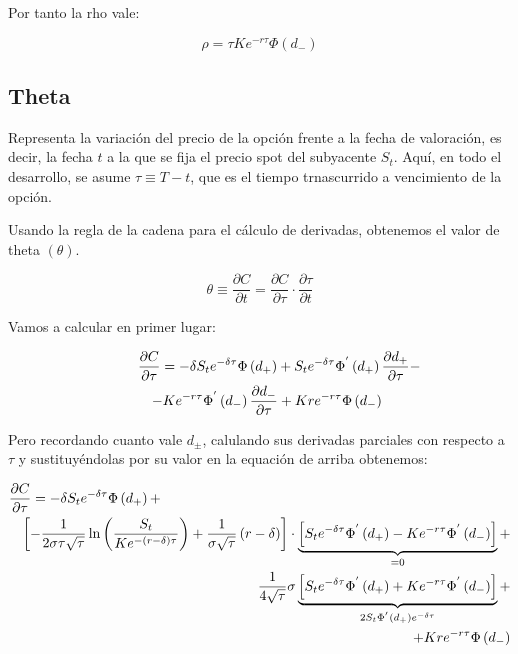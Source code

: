 \documentclass[12pt]{article}
\begin{document}
Por tanto la rho vale:
\newline

\begin{equation}
	\rho = \tau K e^{-r\tau}\Phi\left(d_{-}\right)
\end{equation}
\newline

\subsection{Theta}
Representa la variaci\'{o}n del precio de la opci\'{o}n frente a la fecha de valoraci\'{o}n, es decir, la fecha $t$ a la que se fija el precio
spot del subyacente $S_{t}$. Aqu\'{i}, en todo el desarrollo, se asume $\tau\equiv T-t$, que es el tiempo trnascurrido a vencimiento
de la opci\'{o}n.

Usando la regla de la cadena para el c\'{a}lculo de derivadas, obtenemos el valor de theta $(\theta)$.
\newline

\begin{equation}
	\theta \equiv \frac{\partial C}{\partial t} = \frac{\partial C}{\partial \tau} \cdot \frac{\partial \tau}{\partial t}
\end{equation}
\newline


Vamos a calcular en primer lugar:
\newline

\begin{eqnarray}
	\lefteqn{\frac{\partial C}{\partial \tau} = -\delta S_{t}e^{-\delta\tau}\Phi\left(d_{+}\right)+S_{t}e^{-\delta\tau}\Phi
		^{'}\left(d_{+}\right)\frac{\partial d_{+}}{\partial \tau} - } \nonumber \\
	 & & - Ke^{-r\tau}\Phi^{'}\left(d_{-}\right)\frac{\partial d_{-}}{\partial \tau} + Kre^{-r\tau}\Phi\left(d_{-}\right)
\end{eqnarray}
\newline

Pero recordando cuanto vale $d_{\pm}$, calulando sus derivadas parciales con respecto a $\tau$ y sustituy\'{e}ndolas por su
valor en la equaci\'{o}n de arriba obtenemos:
\newline

\begin{eqnarray*}
	\lefteqn{\frac{\partial C}{\partial \tau} = -\delta S_{t}e^{-\delta\tau}\Phi\left(d_{+}\right) +} \\
	 & & \left[-\frac{1}{2\sigma\tau\sqrt{\tau}}\ln\left(\frac{S_{t}}{Ke^{-\left(r-\delta\right)\tau}}\right) + 
		\frac{1}{\sigma\sqrt{\tau}}\left(r-\delta\right)\right]\cdot\underbrace{\left[S_{t}e^{-\delta\tau}\Phi^{'}
		\left(d_{+}\right)-Ke^{-r\tau}\Phi^{'}\left(d_{-}\right)\right]}_{=0} + \\
	 & & \frac{1}{4\sqrt{\tau}}\sigma\underbrace{\left[S_{t}e^{-\delta\tau}\Phi^{'}\left(d_{+}\right) + Ke^{-r\tau}\Phi^{'}\left(
		d_{-}\right)\right]}_{2S_{t}\Phi^{'}\left(d_{+}\right)e^{-\delta\tau}} + \\
	 & & + Kre^{-r\tau}\Phi\left(d_{-}\right)
\end{eqnarray*}
\end{document}
